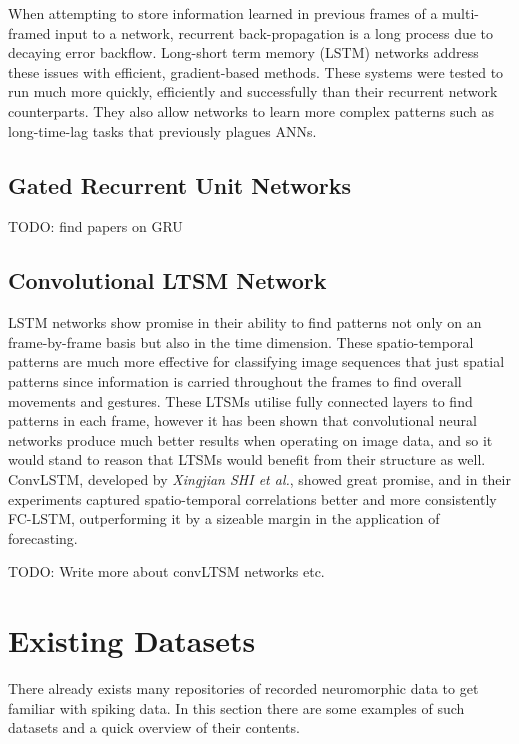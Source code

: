 When attempting to store information learned in previous frames of a multi-framed input to a network, recurrent back-propagation is a long process due to decaying error backflow. Long-short term memory (LSTM) networks\cite{LSTM} address these issues with efficient, gradient-based methods. These systems were tested to run much more quickly, efficiently and successfully than their recurrent network counterparts. They also allow networks to learn more complex patterns such as long-time-lag tasks that previously plagues ANNs.

\subsection{Gated Recurrent Unit Networks}

\color{red} TODO: find papers on GRU \color{black}

\subsection{Convolutional LTSM Network} \label{ssec:conv_lstm}

LSTM networks show promise in their ability to find patterns not only on an frame-by-frame basis but also in the time dimension. These spatio-temporal patterns are much more effective for classifying image sequences that just spatial patterns since information is carried throughout the frames to find overall movements and gestures. These LTSMs utilise fully connected layers to find patterns in each frame, however it has been shown that convolutional neural networks produce much better results when operating on image data, and so it would stand to reason that LTSMs would benefit from their structure as well. ConvLSTM, developed by \textit{Xingjian SHI et al.}, showed great promise, and in their experiments captured spatio-temporal correlations better and more consistently FC-LSTM, outperforming it by a sizeable margin in the application of forecasting.

\color{red} TODO: Write more about convLTSM networks etc. \color{black}

\section{Existing Datasets} \label{sec:existing_datasets}

There already exists many repositories of recorded neuromorphic data to get familiar with spiking data. In this section there are some examples of such datasets and a quick overview of their contents.

